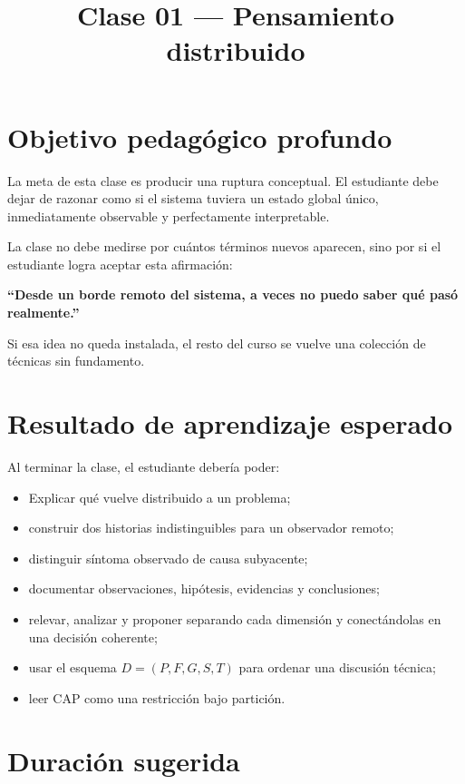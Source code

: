 \documentclass[variant=docente,cover=institutional,mode=screen]{ua-engineering-v6-article}
\title{Clase 01 --- Pensamiento distribuido}
\author{\UAProfessor}
\date{\UADate}
\begin{document}
\maketitle

\section{Objetivo pedagógico profundo}\label{sec:objetivo-pedagogico-profundo}

La meta de esta clase es producir una ruptura conceptual.
El estudiante debe dejar de razonar como si el sistema tuviera un estado global único, inmediatamente observable y perfectamente interpretable.

La clase no debe medirse por cuántos términos nuevos aparecen, sino por si el estudiante logra aceptar esta afirmación:

\begin{center}
\textbf{“Desde un borde remoto del sistema, a veces no puedo saber qué pasó realmente.”}
\end{center}

Si esa idea no queda instalada, el resto del curso se vuelve una colección de técnicas sin fundamento.

\section{Resultado de aprendizaje esperado}\label{sec:resultado-de-aprendizaje-esperado}

Al terminar la clase, el estudiante debería poder:

\begin{itemize}
\item Explicar qué vuelve distribuido a un problema;
\item construir dos historias indistinguibles para un observador remoto;
\item distinguir síntoma observado de causa subyacente;
\item documentar observaciones, hipótesis, evidencias y conclusiones;
\item relevar, analizar y proponer separando cada dimensión y conectándolas en una decisión coherente;
\item usar el esquema $D=(P,F,G,S,T)$ para ordenar una discusión técnica;
\item leer CAP como una restricción bajo partición.
\end{itemize}

\section{Duración sugerida}\label{sec:duracion-sugerida}
\end{document}
